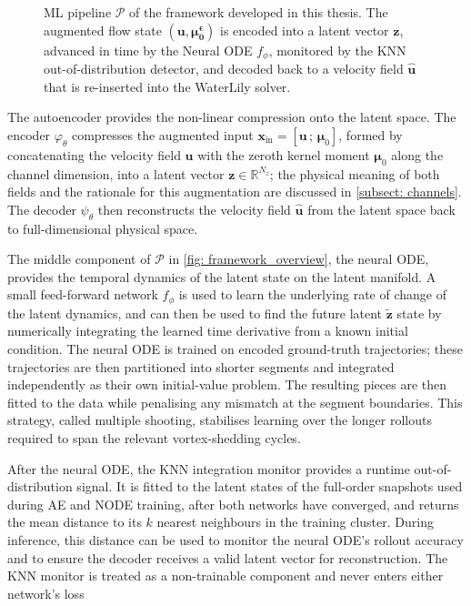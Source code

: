 \begin{figure}[H]
    \centering
    
        \caption{ML pipeline $\mathcal{P}$ of the framework developed in this thesis. The augmented flow state $(\mathbf{u}, \boldsymbol{\mu_0^\epsilon})$ is encoded into a latent vector $\mathbf{z}$, advanced in time by the Neural ODE $f_\phi$, monitored by the KNN out-of-distribution detector, and decoded back to a velocity field $\hat{\mathbf{u}}$ that is re-inserted into the WaterLily solver.}
    \label{fig: framework_overview}
\end{figure}

The autoencoder provides the non-linear compression onto the latent space. The encoder $\varphi_\theta$ compresses the augmented input $\mathbf{x}_\text{in} = [\mathbf{u}\,;\,\boldsymbol{\mu}_0]$, formed by concatenating the velocity field $\mathbf{u}$ with the zeroth kernel moment $\boldsymbol{\mu}_0$ along the channel dimension, into a latent vector $\mathbf{z} \in \mathbb{R}^{N_z}$; the physical meaning of both fields and the rationale for this augmentation are discussed in \autoref{subsect: channels}. The decoder $\psi_\theta$ then reconstructs the velocity field $\hat{\mathbf{u}}$ from the latent space back to full-dimensional physical space.


The middle component of $\mathcal{P}$ in \autoref{fig: framework_overview}, the neural ODE, provides the temporal dynamics of the latent state on the latent manifold. A small feed-forward network $f_\phi$ is used to learn the underlying rate of change of the latent dynamics, and can then be used to find the future latent $\tilde{\mathbf{z}}$ state by numerically integrating the learned time derivative from a known initial condition. The neural ODE is trained on encoded ground-truth trajectories; these trajectories are then partitioned into shorter segments and integrated independently as their own initial-value problem. The resulting pieces are then fitted to the data while penalising any mismatch at the segment boundaries. This strategy, called multiple shooting, stabilises learning over the longer rollouts required to span the relevant vortex-shedding cycles.

After the neural ODE, the KNN integration monitor provides a runtime out-of-distribution signal. It is fitted to the latent states of the full-order snapshots used during AE and NODE training, after both networks have converged, and returns the mean distance to its $k$ nearest neighbours in the training cluster. During inference, this distance can be used to monitor the neural ODE's rollout accuracy and to ensure the decoder receives a valid latent vector for reconstruction. The KNN monitor is treated as a non-trainable component and never enters either network's loss

